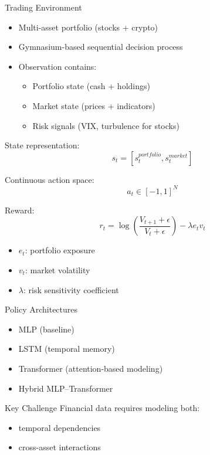 \documentclass[10pt]{beamer}
\begin{document}
\begin{frame}{Trading Environment}
\begin{itemize}
    \item Multi-asset portfolio (stocks + crypto)
    \item Gymnasium-based sequential decision process
    \item Observation contains:
    \begin{itemize}
        \item Portfolio state (cash + holdings)
        \item Market state (prices + indicators)
        \item Risk signals (VIX, turbulence for stocks)
    \end{itemize}
\end{itemize}

\pause

State representation:
\[
s_t = [s_t^{portfolio}, s_t^{market}]
\]

\pause

Continuous action space:
\[
a_t \in [-1,1]^N
\]

\pause
Reward:
\[
r_t = \log\left(\frac{V_{t+1} + \epsilon}{V_t + \epsilon}\right)
 - \lambda e_t v_t
\]
\begin{itemize}
    \item $e_t$: portfolio exposure
    \item $v_t$: market volatility
    \item $\lambda$: risk sensitivity coefficient
\end{itemize}
\end{frame}

\begin{frame}{Policy Architectures}
\begin{itemize}
    \item MLP (baseline)
    \item LSTM (temporal memory)
    \item Transformer (attention-based modeling)
    \item Hybrid MLP--Transformer
\end{itemize}

\begin{block}{Key Challenge}
Financial data requires modeling both:
\begin{itemize}
    \item temporal dependencies
    \item cross-asset interactions
\end{itemize}
\end{block}
\end{frame}
\end{document}
